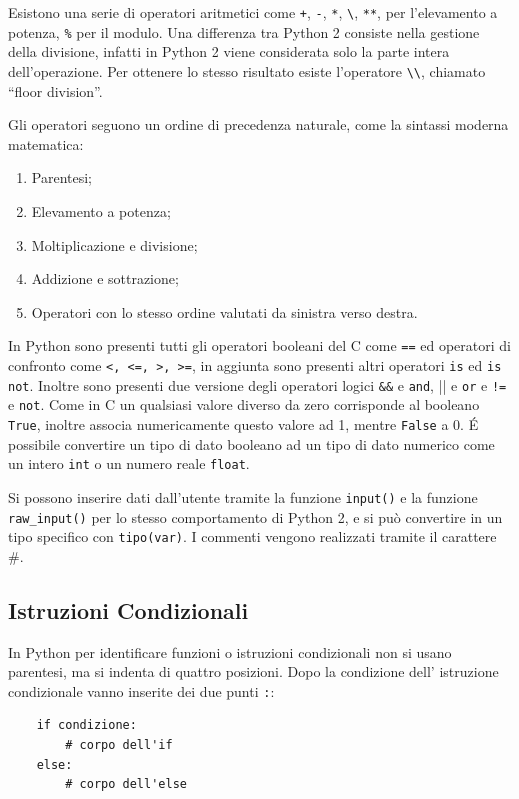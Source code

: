 \documentclass{article}
\numberwithin{equation}{subsection}
\begin{document}
Esistono una serie di operatori aritmetici come \verb|+|, \verb|-|, \verb|*|, \verb|\|, \verb|**|, per l'elevamento a potenza, \verb|%| per il modulo. Una differenza 
tra Python 2 consiste nella gestione della divisione, infatti in Python 2 viene considerata solo la parte intera dell'operazione. Per ottenere lo stesso risultato 
esiste l'operatore \verb|\\|, chiamato ``floor division''. 

Gli operatori seguono un ordine di precedenza naturale, come la sintassi moderna matematica:
\begin{enumerate}
    \item Parentesi;
    \item Elevamento a potenza;
    \item Moltiplicazione e divisione;
    \item Addizione e sottrazione;
    \item Operatori con lo stesso ordine valutati da sinistra verso destra. 
\end{enumerate}

In Python sono presenti tutti gli operatori booleani del C come \verb|==| ed operatori di confronto come \verb|<, <=, >, >=|, in aggiunta sono presenti 
altri operatori \verb|is| ed \verb|is not|. Inoltre sono presenti due versione degli operatori logici \verb|&&| e \verb|and|, || e \verb|or| e \verb|!=| e \verb|not|. 
Come in C un qualsiasi valore diverso da zero corrisponde al booleano \verb|True|, inoltre associa numericamente questo valore ad 1, mentre \verb|False| a 0. \'{E} possibile convertire 
un tipo di dato booleano ad un tipo di dato numerico come un intero \verb|int| o un numero reale \verb|float|. 

Si possono inserire dati dall'utente tramite la funzione \verb|input()| e la funzione \verb|raw_input()| per lo stesso comportamento di Python 2, e si può convertire in un tipo 
specifico con \verb|tipo(var)|. I commenti vengono realizzati tramite il carattere \#. 

\subsection{Istruzioni Condizionali}

In Python per identificare funzioni o istruzioni condizionali non si usano parentesi, ma si indenta di quattro posizioni. Dopo la condizione dell'
istruzione condizionale vanno inserite dei due punti \verb|:|:
\begin{verbatim}
    if condizione: 
        # corpo dell'if
    else:
        # corpo dell'else
\end{verbatim}
\end{document}
